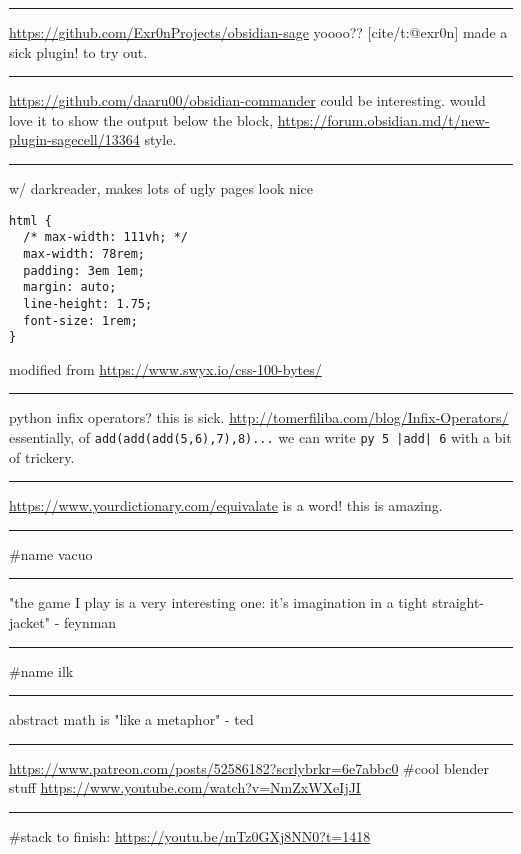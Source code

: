 \documentclass[letterpaper]{article}
\begin{document}
\noindent\rule{\textwidth}{0.5pt}

\url{https://github.com/Exr0nProjects/obsidian-sage} yoooo?? [cite/t:@exr0n]
made a sick plugin! to try out.

\noindent\rule{\textwidth}{0.5pt}

\url{https://github.com/daaru00/obsidian-commander} could be interesting.
would love it to show the output below the block,
\url{https://forum.obsidian.md/t/new-plugin-sagecell/13364} style.

\noindent\rule{\textwidth}{0.5pt}

w/ darkreader, makes lots of ugly pages look nice

\begin{verbatim}
html {
  /* max-width: 111vh; */
  max-width: 78rem;
  padding: 3em 1em;
  margin: auto;
  line-height: 1.75;
  font-size: 1rem;
}
\end{verbatim}

modified from \url{https://www.swyx.io/css-100-bytes/}

\noindent\rule{\textwidth}{0.5pt}

python infix operators? this is sick.
\url{http://tomerfiliba.com/blog/Infix-Operators/} essentially, of
\texttt{add(add(add(5,6),7),8)...} we can write \texttt{py 5 |add| 6} with a bit of
trickery.

\noindent\rule{\textwidth}{0.5pt}

\url{https://www.yourdictionary.com/equivalate} is a word! this is amazing.

\noindent\rule{\textwidth}{0.5pt}

\#name vacuo

\noindent\rule{\textwidth}{0.5pt}

"the game I play is a very interesting one: it's imagination in a tight
straight-jacket" - feynman

\noindent\rule{\textwidth}{0.5pt}

\#name ilk

\noindent\rule{\textwidth}{0.5pt}

abstract math is "like a metaphor" - ted

\noindent\rule{\textwidth}{0.5pt}

\url{https://www.patreon.com/posts/52586182?scrlybrkr=6e7abbc0} \#cool blender
stuff \url{https://www.youtube.com/watch?v=NmZxWXeIjJI}

\noindent\rule{\textwidth}{0.5pt}

\#stack to finish: \url{https://youtu.be/mTz0GXj8NN0?t=1418}
\end{document}
